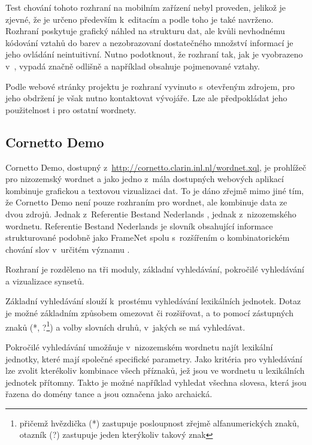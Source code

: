 \documentclass[a4paper,11pt,openany,twoside]{book}
\newcommand\ex{\textsf}
\begin{document}
					Test chování tohoto rozhraní na mobilním zařízení nebyl proveden, jelikož je zjevné, že je určeno především k~editacím a podle toho je také navrženo. Rozhraní poskytuje grafický náhled na strukturu dat, ale kvůli nevhodnému kódování vztahů do barev a nezobrazovaní dostatečného množství informací je jeho ovládání neintuitivní. Nutno podotknout, že rozhraní tak, jak je vyobrazeno v~\textcite{szymanski2007cooperative}, vypadá značně odlišně a například obsahuje pojmenované vztahy.

					Podle webové stránky projektu \textcite{wordnetsolution2007web} je rozhraní vyvinuto s~otevřeným zdrojem, pro jeho obdržení je však nutno kontaktovat vývojáře. Lze ale předpokládat jeho použitelnost i pro ostatní wordnety.

				\subsection{Cornetto Demo}
				\label{wnvis:cornetto}

					Cornetto Demo, dostupný z~\url{http://cornetto.clarin.inl.nl/wordnet.xql}, je prohlížeč pro nizozemský wordnet a jako jedno z~mála dostupných webových aplikací kombinuje grafickou a textovou vizualizaci dat. To je dáno zřejmě mimo jiné tím, že Cornetto Demo není pouze rozhraním pro wordnet, ale kombinuje data ze dvou zdrojů. Jednak z~Referentie Bestand Nederlands 
					, jednak z~nizozemského wordnetu. Referentie Bestand Nederlands je slovník obsahující informace strukturované podobně jako FrameNet \parencite{fillmore2004framenet} spolu s~rozšířením o kombinatorickém chování slov v~určitém významu \parencite{horak2008development}. 

					Rozhraní je rozděleno na tři moduly, základní vyhledávání, pokročilé vyhledávání a vizualizace synsetů. 

					Základní vyhledávání slouží k~prostému vyhledávání lexikálních jednotek. Dotaz je možné základním způsobem omezovat či rozšiřovat, a to pomocí zástupných znaků (\ex{*}, \ex{?}\footnote{přičemž hvězdička (\ex{*}) zastupuje posloupnost zřejmě alfanumerických znaků, otazník (\ex{?}) zastupuje jeden kterýkoliv takový znak}) a volby slovních druhů, v~jakých se má vyhledávat. \parencite{cornettoGettingStarted}

					Pokročilé vyhledávání umožňuje v~nizozemském wordnetu najít lexikální jednotky, které mají společné specifické parametry. Jako kritéria pro vyhledávání lze zvolit kterékoliv kombinace všech příznaků, jež jsou ve wordnetu u lexikálních jednotek přítomny. Takto je možné například vyhledat všechna slovesa, která jsou řazena do domény tance a jsou označena jako archaická.  
\end{document}
